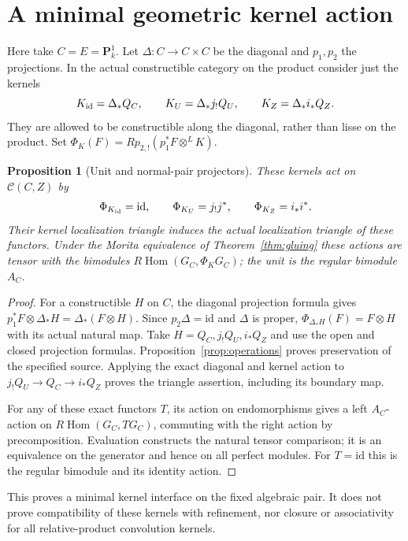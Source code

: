 \documentclass[11pt]{article}
\newtheorem{proposition}[theorem]{Proposition}
\theoremstyle{definition}
\theoremstyle{remark}
\newcommand{\RHom}{R\operatorname{Hom}}
\begin{document}
\section{A minimal geometric kernel action}
Here take $C=E=\mathbf P^1_k$.  Let $\Delta:C\to C\times C$ be the
diagonal and $p_1,p_2$ the projections.  In the actual constructible
category on the product consider just the kernels
\[
 K_{\rm id}=\Delta_*Q_C,\qquad
 K_U=\Delta_*j_!Q_U,\qquad K_Z=\Delta_*i_*Q_Z.
\]
They are allowed to be constructible along the diagonal, rather than
lisse on the product.  Set
$\Phi_K(F)=Rp_{2,!}(p_1^*F\otimes^L K)$.

\begin{proposition}[Unit and normal-pair projectors]\label{prop:kernels}
These kernels act on $\mathcal C(C,Z)$ by
\[
 \Phi_{K_{\rm id}}=\mathrm{id},\qquad
 \Phi_{K_U}=j_!j^*,\qquad \Phi_{K_Z}=i_*i^*.
\]
Their kernel localization triangle induces the actual localization
triangle of these functors.  Under the Morita equivalence of
Theorem~\ref{thm:gluing} these actions are tensor with the bimodules
$\RHom(G_C,\Phi_K G_C)$; the unit is the regular bimodule $A_C$.
\end{proposition}
\begin{proof}
For a constructible $H$ on $C$, the diagonal projection formula gives
$p_1^*F\otimes\Delta_*H=\Delta_*(F\otimes H)$.  Since
$p_2\Delta=\mathrm{id}$ and $\Delta$ is proper,
$\Phi_{\Delta_*H}(F)=F\otimes H$ with its actual natural map.
Take $H=Q_C,j_!Q_U,i_*Q_Z$ and use the open and closed projection
formulas.  Proposition~\ref{prop:operations} proves preservation of
the specified source.  Applying the exact diagonal and kernel action
to $j_!Q_U\to Q_C\to i_*Q_Z$ proves the triangle assertion, including
its boundary map.

For any of these exact functors $T$, its action on endomorphisms gives
a left $A_C$-action on $\RHom(G_C,TG_C)$, commuting with the right action
by precomposition.  Evaluation constructs the natural tensor comparison;
it is an equivalence on the generator and hence on all perfect modules.
For $T=\mathrm{id}$ this is the regular bimodule and its identity action.
\end{proof}
This proves a minimal kernel interface on the fixed algebraic pair.
It does not prove compatibility of these kernels with refinement, nor
closure or associativity for all relative-product convolution kernels.
\end{document}
